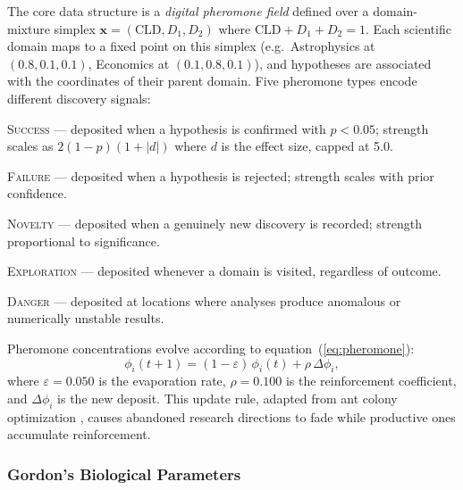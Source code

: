 \documentclass[usenatbib]{rasti}
\begin{document}
The core data structure is a \emph{digital pheromone field} defined over a domain-mixture simplex $\mathbf{x} = (\mathrm{CLD}, D_1, D_2)$ where $\mathrm{CLD} + D_1 + D_2 = 1$.
Each scientific domain maps to a fixed point on this simplex (e.g.\ Astrophysics at $(0.8, 0.1, 0.1)$, Economics at $(0.1, 0.8, 0.1)$), and hypotheses are associated with the coordinates of their parent domain.
Five pheromone types encode different discovery signals:
\begin{description}
  \item \textsc{Success} --- deposited when a hypothesis is confirmed with $p < 0.05$; strength scales as $2(1 - p)(1 + |d|)$ where $d$ is the effect size, capped at 5.0.
  \item \textsc{Failure} --- deposited when a hypothesis is rejected; strength scales with prior confidence.
  \item \textsc{Novelty} --- deposited when a genuinely new discovery is recorded; strength proportional to significance.
  \item \textsc{Exploration} --- deposited whenever a domain is visited, regardless of outcome.
  \item \textsc{Danger} --- deposited at locations where analyses produce anomalous or numerically unstable results.
\end{description}
Pheromone concentrations evolve according to equation~(\ref{eq:pheromone}):
\begin{equation}
  \phi_i(t+1) = (1 - \varepsilon)\,\phi_i(t) + \rho\,\Delta\phi_i,
  \label{eq:pheromone}
\end{equation}
where $\varepsilon = 0.050$ is the evaporation rate, $\rho = 0.100$ is the reinforcement coefficient, and $\Delta\phi_i$ is the new deposit.
This update rule, adapted from ant colony optimization \citep{Dorigo1996}, causes abandoned research directions to fade while productive ones accumulate reinforcement.

\subsubsection{Gordon's Biological Parameters}
\end{document}
